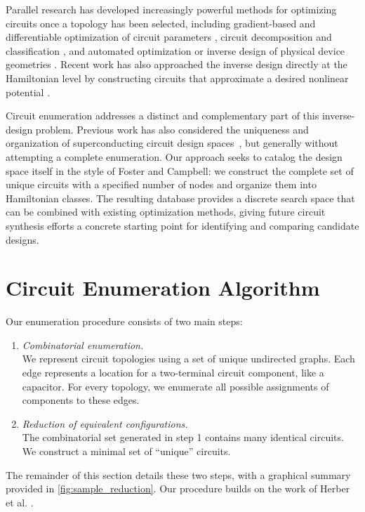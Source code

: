 Parallel research has developed increasingly powerful methods for optimizing circuits once a topology has been selected, including gradient-based and differentiable optimization of circuit parameters \cite{rajabzadehGeneralFrameworkGradientBased2024, Wang2025SuperGrad}, circuit decomposition and classification \cite{smitham2024reciprocallumpedelementsuperconductingcircuits}, and automated optimization or inverse design of physical device geometries \cite{Shanto2024SQuADDS,Eriksson2025QDesignOptimizer,Seidel2026InverseDesign,Peng2026SQChipEM}. Recent work has also approached the inverse design directly at the Hamiltonian level by constructing circuits that approximate a desired nonlinear potential \cite{Hajihosseini2025Trainmon}.

Circuit enumeration addresses a distinct and complementary part of this inverse-design problem. Previous work has also considered the uniqueness and organization of superconducting circuit design spaces~\cite{rajabzadehGeneralFrameworkGradientBased2024,smitham2024reciprocallumpedelementsuperconductingcircuits}, but generally without attempting a complete enumeration. Our approach seeks to catalog the design space itself in the style of Foster and Campbell: we construct the complete set of unique circuits with a specified number of nodes and organize them into Hamiltonian classes. The resulting database provides a discrete search space that can be combined with existing optimization methods, giving future circuit synthesis efforts a concrete starting point for identifying and comparing candidate designs.

\section{Circuit Enumeration Algorithm}\label{sec:CirEnumAlg}

Our enumeration procedure consists of two main steps:
\begin{enumerate}
    \item {\em Combinatorial enumeration.} \\ We represent circuit topologies using a set of unique undirected graphs. Each edge represents a location for a two-terminal circuit component, like a capacitor. For every topology, we enumerate all possible assignments of components to these edges.
    \item {\em Reduction of equivalent configurations.} \\ The combinatorial set generated in step 1 contains many identical circuits. We construct a minimal set of ``unique'' circuits. 
\end{enumerate}
The remainder of this section details these two steps, with a graphical summary provided in \cref{fig:sample_reduction}. Our procedure builds on the work of Herber et al. \cite{Herber:2017aa, herber:2017ab, herber_enhancements_2020}.


